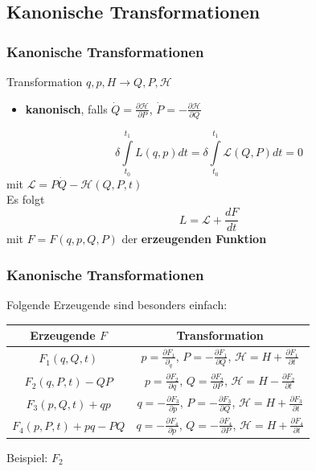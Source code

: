 \documentclass[hyperref={pdfpagelabels=false}]{beamer}
\begin{document}
\subsection*{Kanonische Transformationen}
\begin{frame}
\frametitle{Kanonische Transformationen}
Transformation $q,p,H\rightarrow Q,P,\mathcal{H}$\pause
\begin{itemize}
\item \textbf{kanonisch}, falls
$\dot{Q} = \frac{\partial\mathcal{H}}{\partial P}$, $\dot{P} = - \frac{\partial \mathcal{H}}{\partial Q}$
\end{itemize}
\begin{equation*}
\delta \int\limits_{t_0}^{t_1} L(q,p) dt = \delta \int\limits_{t_0}^{t_1} \mathcal{L}(Q,P) dt = 0
\end{equation*}
mit $\mathcal{L} = P\dot{Q}-\mathcal{H}(Q,P,t)$\\
\vspace*{1cm}\pause
Es folgt
\begin{equation*}
L = \mathcal{L} + \frac{dF}{dt}
\end{equation*}
mit $F = F(q,p,Q,P)$ der \textbf{erzeugenden Funktion}
\end{frame}
\begin{frame}
\frametitle{Kanonische Transformationen}
Folgende Erzeugende sind besonders einfach:\\
\begin{center}
\begin{tabular}{c|c}
Erzeugende $F$ & Transformation \\ 
\hline 
$F_1(q,Q,t)$ & $p = \frac{\partial F_1}{\partial_q}$, $P = - \frac{\partial F_1}{\partial Q}$, $\mathcal{H} = H + \frac{\partial F_1}{\partial t}$ \\ 
$F_2(q,P,t)-QP$ & $p = \frac{\partial F_2}{\partial q}$, $Q = \frac{\partial F_2}{\partial P}$, $\mathcal{H} = H - \frac{\partial F_2}{\partial t}$ \\ 
$F_3(p,Q,t)+qp$ & $q = - \frac{\partial F_3}{\partial p}$, $P = - \frac{\partial F_3}{\partial Q}$, $\mathcal{H} = H + \frac{\partial F_3}{\partial t}$ \\ 
$F_4(p,P,t)+pq-PQ$ & $q = -\frac{\partial F_4}{\partial p}$, $Q = - \frac{\partial F_4}{\partial P}$, $\mathcal{H} = H + \frac{\partial F_4}{\partial t}$ 
\end{tabular} 
\end{center}
Beispiel: $F_2$
\end{frame}
\end{document}
